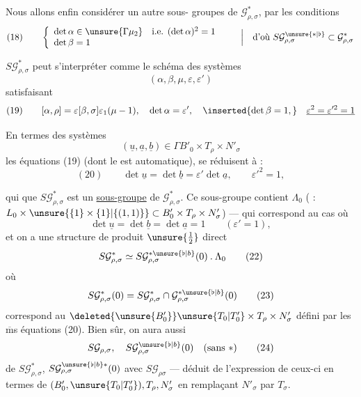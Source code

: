 Nous allons enfin considérer un autre sous- groupes de
$\mathcal G_{\rho,\sigma}^{*}$, par les conditions
\[
(18)\qquad
\left\{\begin{array}{l}
\det\alpha\in\unsure{\Gamma\mu_2}\quad\text{i.e. }(\det\alpha)^2=1\\
\det\beta=1
\end{array}\right.
\qquad\left|\quad\text{d'où }S\mathcal G_{\rho,\sigma}^{\unsure{*|\flat}}
\subset\mathcal G_{\rho,\sigma}^{*}\right.
\]

 
$S\mathcal G_{\rho,\sigma}^{*}$ peut s'interpréter comme le schéma des systèmes
\[
(\alpha,\beta,\mu,\varepsilon,\varepsilon')
\]
satisfaisant
\[
(19)\qquad [\alpha,\rho]=\varepsilon[\beta,\sigma]\varepsilon_1(\mu-1),
\quad\det\alpha=\varepsilon',\quad
\inserted{\det\beta=1,}\quad
\underline{\varepsilon^2=\varepsilon'^2=1}
\]

En termes des systèmes
\[
(\underline u,\underline a,\underline b)\in\Gamma B'_0\times T_\rho\times N'_\sigma
\]
les équations (19) (dont le  est automatique), se réduisent à :
\[
(20)\qquad\det\underline u=\det\underline b=\varepsilon'\det\underline a,
\qquad\varepsilon'^2=1,
\]



qui  que $S\mathcal{G}_{\rho,\sigma}^{*}$ est  un \uline{sous-groupe}
de $\mathcal{G}_{\rho,\sigma}^{*}$. Ce sous-groupe contient $\Lambda_0$
( : $L_0\times\unsure{\{1\}\times\{1\}|\{(1,1)\}}\subset B'_0\times T_\rho\times N'_\sigma$) --- qui
correspond au cas où 
\[
\det\underline{u}=\det\underline{b}=\det\underline{a}=1\qquad(\varepsilon'=1),
\tag{21}
\]
et on a une structure de produit $\unsure{\frac12}$ direct
\[
S\mathcal{G}_{\rho,\sigma}^{*}\simeq S\mathcal{G}_{\rho,\sigma}^{*\unsure{\flat|b}}(0)\mathbin{.}\Lambda_0
\tag{22}
\]
où
\[
S\mathcal{G}_{\rho,\sigma}^{*}(0)=S\mathcal{G}_{\rho,\sigma}^{*}\cap\mathcal{G}_{\rho,\sigma}^{*\unsure{\flat|b}}(0)
\tag{23}
\]
correspond au   $\deleted{\unsure{B'_0}}\unsure{T_0|T'_0}\times T_\rho\times N'_\sigma$
 défini par les $\overline{\mathrm m}$s équations
(20). Bien sûr, on aura aussi
\[
S\mathcal{G}_{\rho,\sigma},\quad S\mathcal{G}_{\rho,\sigma}^{\unsure{\flat|b}}(0)\quad(\text{sans }*)
\tag{24}
\]
  de $S\mathcal{G}_{\rho,\sigma}^{*}$, $S\mathcal{G}_{\rho,\sigma}^{\unsure{\flat|b}*}(0)$ avec
$S\mathcal{G}_{\rho\sigma}$ --- déduit de l'expression
de ceux-ci en termes de $(B'_0,\unsure{T_0|T'_0}),T_\rho,N'_\sigma$
en remplaçant $N'_\sigma$ par $T_\sigma$.

